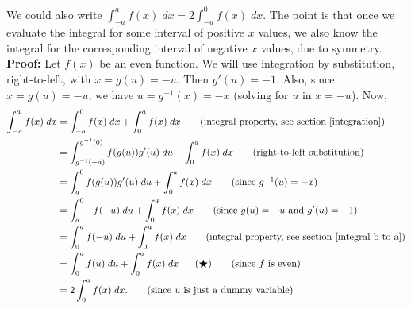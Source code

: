   	\bigskip
	
	\hfil{}
	\bigskip

\noindent We could also write $\int_{-a}^a f(x) \; dx = 2\int_{-a}^0 f(x) \; dx.$ The point is that once we evaluate the integral for some interval of positive $x$ values, we also know the integral for the corresponding interval of negative $x$ values, due to symmetry.  \\

\noindent \textbf{Proof:} Let $f(x)$ be an even function. We will use integration by substitution, right-to-left, with $x = g(u) = -u$. Then $g'(u) = -1$. Also, since $x = g(u) = -u$, we have $u = g^{-1}(x) = -x$ (solving for $u$ in $x = -u$). Now,
\begin{align*}
\int_{-a}^a f(x) \; dx & = \int_{-a}^0 f(x) \; dx + \int_{0}^a f(x) \; dx \tag{integral property, see section \ref{integration}} \\
	& = \int_{g^{-1}(-a)}^{g^{-1}(0)} f(g(u))g'(u) \; du + \int_{0}^a f(x) \; dx \tag{right-to-left substitution} \\
	& = \int_{a}^0 f(g(u))g'(u) \; du + \int_{0}^a f(x) \; dx \tag{since $g^{-1}(u) = -x$} \\
	& = \int_{a}^0 -f(-u) \; du + \int_{0}^a f(x) \; dx \tag{since $g(u) = -u$ and $g'(u) = -1$} \\
	& =  \int_{0}^a f(-u) \; du + \int_{0}^a f(x) \; dx\tag{integral property, see section \ref{integral b to a}} \\
	& = \int_{0}^a f(u) \; du + \int_{0}^a f(x) \; dx \;\;\;\;\;\; (\bigstar) \tag{since $f$ is even} \\
	& =  2\int_{0}^a f(x) \; dx. \tag{since $u$ is just a dummy variable}
\end{align*}



